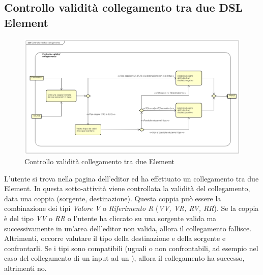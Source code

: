    \subsection{Controllo validità collegamento tra due DSL Element}
    \begin{figure}[H]
      \centering
      \includegraphics[width=1.1\textwidth]{res/img/controlloCollegamento.png}
      \caption{Controllo validità collegamento tra due  Element}
      \label{fig:diagram_model}
    \end{figure}
L'utente si trova nella pagina dell'editor ed ha effettuato un collegamento tra due  Element. In questa sotto-attività viene controllata la validità del collegamento, data una coppia (sorgente, destinazione). Questa coppia può essere la combinazione dei tipi \textit{Valore V} o \textit{Riferimento R} (\textit{VV, VR, RV, RR}). Se la coppia è del tipo \textit{VV} o \textit{RR} o l'utente ha cliccato su una sorgente valida ma successivamente in un'area dell'editor non valida, allora il collegamento fallisce. Altrimenti, occorre valutare il tipo della destinazione e della sorgente e confrontarli. Se i tipi sono compatibili (uguali o non confrontabili, ad esempio nel caso del collegamento di un input ad un ), allora il collegamento ha successo, altrimenti no. 
